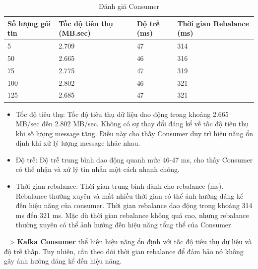\begin{enumerate}
        \begin{longtable}{|p{}|p{}|p{}|p{}|}
        \caption{Đánh giá Consumer}\\
        \hline
        \textbf{Số lượng gói tin} & \textbf{Tốc độ tiêu thụ (MB.sec)} & \textbf{Độ trễ (ms)} & \textbf{Thời gian Rebalance (ms)}  \\
        \hline
        5 & 2.709 & 47 & 314\\
        \hline
        50 & 2.665 & 46 & 316\\
        \hline
        75 & 2.775 & 47 & 319\\
        \hline
        100 & 2.802 & 46 & 321\\
        \hline
        125 & 2.685 & 47 & 321\\
        \hline
    \end{longtable}
    \begin{itemize}[label=--]
            \item Tốc độ tiêu thụ: Tốc độ tiêu thụ dữ liệu dao động trong khoảng 2.665 MB/sec đến 2.802 MB/sec. Không có sự thay đổi đáng kể về tốc độ tiêu thụ khi số lượng message tăng. Điều này cho thấy Consumer duy trì hiệu năng ổn định khi xử lý lượng message khác nhau.
            \item Độ trễ: Độ trễ trung bình dao động quanh mức 46-47 ms, cho thấy Consumer có thể nhận và xử lý tin nhắn một cách nhanh chóng.
            \item Thời gian rebalance: Thời gian trung bình dành cho rebalance (ms). Rebalance thường xuyên và mất nhiều thời gian có thể ảnh hưởng đáng kể đến hiệu năng của consumer. Thời gian rebalance dao động trong khoảng 314 ms đến 321 ms. Mặc dù thời gian rebalance không quá cao, nhưng rebalance thường xuyên có thể ảnh hưởng đến hiệu năng tổng thể của Consumer.
        \end{itemize}
        => \textbf{Kafka Consumer} thể hiện hiệu năng ổn định với tốc độ tiêu thụ dữ liệu và độ trễ thấp. Tuy nhiên, cần theo dõi thời gian rebalance để đảm bảo nó không gây ảnh hưởng đáng kể đến hiệu năng.
\end{enumerate} 
